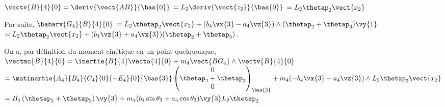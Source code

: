

\ifprof
\begin{corrige}
$\vectv{B}{4}{0} = \deriv{\vect{AB}}{\bas{0}}$
$=L_2\deriv{\vect{z_2}}{\bas{0}}$
$=L_2\thetap_2 \vect{x_2}$
\end{corrige}
\else
\fi
{}
\ifprof
\begin{corrige}
Par suite, 
$\babarv{G_4}{B}{4}{0}$
$=L_2\thetap_2 \vect{x_2} + (b_4\vx{3}-a_4 \vz{3})\wedge (\thetap_2+\thetap_3)\vy{1}$
$=L_2\thetap_2 \vect{x_2} + (b_4\vz{3}+a_4 \vx{3}) (\thetap_2+\thetap_3)$.

\end{corrige}
\else
\fi

%
%

\ifprof
\begin{corrige}
On a, par définition du moment cinétique en un point quelquonque, 
$\vectmc{B}{4}{0} = \inertie{B}{4} \vecto{4}{0} + m_4 \vect{BG_4}\wedge\vectv{B}{4}{0}$
$=\matinertie{A_4}{B_4}{C_4}{0}{-E_4}{0}{\bas{3}} \begin{pmatrix} 0 \\ \thetap_2+\thetap_3\\  0\end{pmatrix}_{\bas{3}}
+  m_4 (-b_4\vx{3}+a_4 \vz{3})\wedge  L_2\thetap_2 \vect{x_2} $
$=B_4 \left(\thetap_2+\thetap_3\right) \vy{3}+  m_4 ( b_4\sin\theta_3 +a_4 \cos\theta_3 )\vy{3} L_2\thetap_2  $
\end{corrige}
\else
\fi


